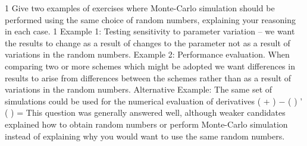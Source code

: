 \documentclass[a4paper,12pt]{article}
\begin{document}
1 Give two examples of exercises where Monte-Carlo simulation should be performed
using the same choice of random numbers, explaining your reasoning in each case. 
1
Example 1: Testing sensitivity to parameter variation – we want the results to change
as a result of changes to the parameter not as a result of variations in the random
numbers.
Example 2: Performance evaluation. When comparing two or more schemes which
might be adopted we want differences in results to arise from differences between the
schemes rather than as a result of variations in the random numbers.
Alternative Example: The same set of simulations could be used for the numerical
evaluation of derivatives
\theta  ( \alpha  + \delta  ) − \theta  ( \alpha  )
\theta  ' ( \alpha  ) =
\delta 
This question was generally answered well, although weaker candidates explained
how to obtain random numbers or perform Monte-Carlo simulation instead of
explaining why you would want to use the same random numbers.
\end{document}
